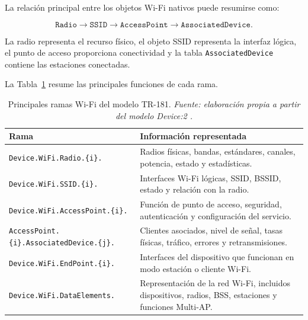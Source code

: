 La relación principal entre los objetos Wi-Fi nativos puede resumirse
como:

\[
    \texttt{Radio}
    \longrightarrow
    \texttt{SSID}
    \longrightarrow
    \texttt{AccessPoint}
    \longrightarrow
    \texttt{AssociatedDevice}.
\]

La radio representa el recurso físico, el objeto SSID representa la
interfaz lógica, el punto de acceso proporciona conectividad y la tabla
\texttt{AssociatedDevice} contiene las estaciones conectadas.

La Tabla~\ref{tab:ramas-wifi-tr181} resume las principales funciones de
cada rama.

\begin{table}[H]
    \centering
    \small
    \renewcommand{\arraystretch}{1.35}

    \caption[Principales ramas Wi-Fi del modelo TR-181.]
    {Principales ramas Wi-Fi del modelo TR-181.
    \textit{Fuente: elaboración propia a partir del modelo Device:2
    \cite{bbf_tr181}.}}

    \label{tab:ramas-wifi-tr181}

    \begin{tabular}{
        p{}
        p{}
    }
        \hline
        \textbf{Rama}
        &
        \textbf{Información representada}
        \\
        \hline

        \texttt{Device.WiFi.Radio.\{i\}.}
        &
        Radios físicas, bandas, estándares, canales, potencia, estado y
        estadísticas.
        \\

        \texttt{Device.WiFi.SSID.\{i\}.}
        &
        Interfaces Wi-Fi lógicas, SSID, BSSID, estado y relación con la
        radio.
        \\

        \texttt{Device.WiFi.AccessPoint.\{i\}.}
        &
        Función de punto de acceso, seguridad, autenticación y
        configuración del servicio.
        \\

        \texttt{AccessPoint.\{i\}.AssociatedDevice.\{j\}.}
        &
        Clientes asociados, nivel de señal, tasas físicas, tráfico,
        errores y retransmisiones.
        \\

        \texttt{Device.WiFi.EndPoint.\{i\}.}
        &
        Interfaces del dispositivo que funcionan en modo estación o
        cliente Wi-Fi.
        \\

        \texttt{Device.WiFi.DataElements.}
        &
        Representación de la red Wi-Fi, incluidos dispositivos, radios,
        BSS, estaciones y funciones Multi-AP.
        \\

        \hline
    \end{tabular}
\end{table}

